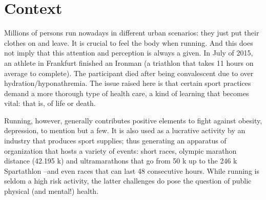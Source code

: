 \chapter*{Context} %

Millions of persons run nowadays in different urban scenarios: they just put
their clothes on and leave. It is crucial to feel the body when running. And this
does not imply that this attention and perception is always a given. In July of
2015, an athlete in Frankfurt finished an Ironman (a triathlon that takes 11
hours on average to complete). The participant died after being convalescent
due to over hydration/hyponathremia. The issue raised here is that certain
sport practices demand a more thorough type of health care, a  
kind of learning that becomes vital: that is, of life or death.


Running, however, generally contributes positive elements to fight against
obesity, depression, to mention but a few. It is also used as a lucrative activity
by an industry that produces sport supplies; thus generating an apparatus
of organization that hosts a variety of events: short races, olympic marathon
distance (42.195 k) and ultramarathons that go from 50 k up to the 246 k
Spartathlon –and even races that can last 48 consecutive hours. While running
is seldom a high risk activity, the latter challenges do pose the question of
public physical (and mental!) health.%
%


